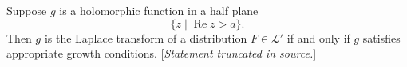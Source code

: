 Suppose $g$ is a holomorphic function in a half plane
$$\{z \mid \operatorname{Re} z > a\}.$$
Then $g$ is the Laplace transform of a distribution $F \in \mathcal{L}'$ if and only if $g$ satisfies appropriate growth conditions.
[\textit{Statement truncated in source.}]

